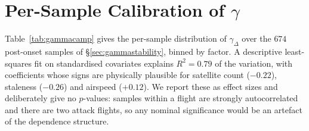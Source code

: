 \section{Per-Sample Calibration of $\gamma$}
\label{app:gamma}
Table~\ref{tab:gammacamp} gives the per-sample distribution of $\gamma_{\Delta}$
over the $674$ post-onset samples of \S\ref{sec:gammastability}, binned by
factor. A descriptive least-squares fit on standardised covariates explains
$R^{2}=0.79$ of the variation, with coefficients whose signs are physically
plausible for satellite count ($-0.22$), staleness ($-0.26$) and airspeed
($+0.12$). We report these as effect sizes and deliberately give no $p$-values:
samples within a flight are strongly autocorrelated and there are two attack
flights, so any nominal significance would be an artefact of the dependence
structure.

\begin{table}[t]
\centering
\caption{Per-sample distribution of the baseline-corrected rate
$\gamma_{\Delta}$, binned by factor, over $674$ post-onset samples. Counts are
shown because coverage is uneven: airspeed bins above $1$\,m/s are
sparse, since these are hover flights. Generated by
.}
\label{tab:gammacamp}
\scriptsize
\renewcommand{\arraystretch}{1.02}

\end{table}

